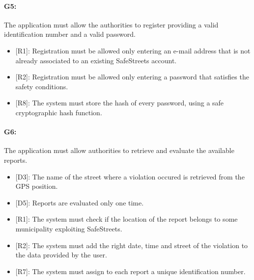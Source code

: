 \documentclass[12pt,a4paper]{report}
\begin{document}
			\paragraph {G5:} The application must allow the authorities to register providing a valid identification number and a valid password.
		\begin{itemize}
			\item{[R1]:} Registration must be allowed only entering an e-mail address that is not already associated to an existing SafeStreets account.
			\item{[R2]:} Registration must be allowed only entering a password that satisfies the safety conditions.
			\item{[R8]:} The system must store the hash of every password, using a safe cryptographic hash function.
		\end{itemize}
			\paragraph {G6:} The application must allow authorities to retrieve and evaluate the available reports.
		\begin{itemize}
			\item{[D3]:} The name of the street where a violation occured is retrieved from the GPS position.
			\item{[D5]:} Reports are evaluated only one time.
		\end{itemize}
		\begin{itemize}
			\item{[R1]:} The system must check if the location of the report belongs to some municipality exploiting SafeStreets.
			\item{[R2]:} The system must add the right date, time and street of the violation to the data provided by the user.
			\item{[R7]:} The system must assign to each report a unique identification number.
		\end{itemize}
\end{document}

